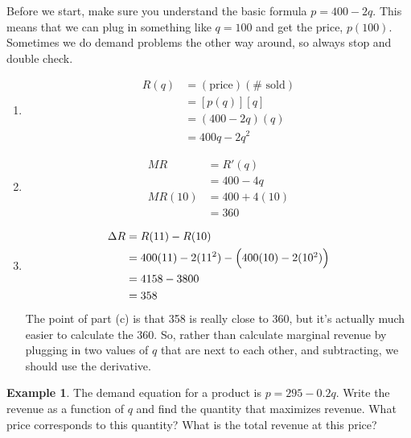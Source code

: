 \documentclass[oneside]{book}
\newcommand{\BigParens}[1]
{\left(\raisebox{0in}[1.25\height]{$#1$}\right)}
\theoremstyle{definition}
\newtheorem{example}{Example}
\theoremstyle{solution}
\newtheorem*{solution}{Solution}
\newenvironment{solution}{\vspace{2in}\comment}{\endcomment}
\begin{document}
\begin{solution}
  Before we start, make sure you understand the basic formula
  $p=400-2q$.  This means that we can plug in something like $q=100$
  and get the price, $p(100)$.  Sometimes we do demand problems the
  other way around, so always stop and double check.

\begin{enumerate}
\item \begin{align*}
R(q) & = (\text{price})(\#\text{ sold})\\
   & = [p(q)][q]\\
   & = (400-2q)(q)\\
   & = 400q-2q^2
\end{align*}

\item 
\begin{align*}
MR & = R'(q)\\
  & = 400 - 4q\\
MR(10) & = 400+4(10)\\
 & = 360
\end{align*}

\item 
\begin{align*}
\Delta R & = R(11) - R(10)\\
 & = 400(11)-2(11^2) - \BigParens{400(10)-2(10^2)}\\
 & = 4158 - 3800\\
 & = 358
\end{align*} 
The point of part (c) is that 358 is really close to 360, but it's
actually much easier to calculate the 360.  So, rather than calculate
marginal revenue by plugging in two values of $q$ that are next to
each other, and subtracting, we should use the derivative.
\end{enumerate}
\end{solution}

\begin{example}
  The demand equation for a product is $p = 295 - 0.2q$. Write the
  revenue as a function of $q$ and find the quantity that maximizes
  revenue. What price corresponds to this quantity? What is the total
  revenue at this price?
\end{example}
\end{document}
